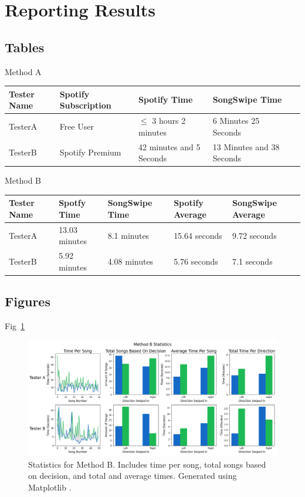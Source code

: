 \documentclass{article}
\begin{document}
\section{Reporting Results}

\subsection*{Tables}
Method A
\begin{longtable}{lllll}
Tester Name & Spotify Subscription & Spotify Time & SongSwipe Time \\
\hline
TesterA & Free User & $\leq$ 3 hours 2 minutes & 6 Minutes 25 Seconds \\
TesterB & Spotify Premium & 42 minutes and 5 Seconds & 13 Minutes and 38 Seconds \\
\end{longtable}

Method B
\begin{longtable}{lllll}
    Tester Name & Spotfy Time & SongSwipe Time & Spotify Average & SongSwipe Average \\
    \hline
    TesterA & 13.03 minutes & 8.1 minutes & 15.64 seconds & 9.72 seconds \\
    TesterB & 5.92 minutes & 4.08 minutes & 5.76 seconds & 7.1 seconds \\
\end{longtable}

\subsection*{Figures}

Fig~\ref{fig:methodbstats}

\begin{figure}[ht]
    \centering
    \includegraphics[width=6in]{./method_b_statistics.png}
    \caption{Statistics for Method B. Includes time per song, total songs based on decision, and total and average times. Generated using Matplotlib \cite{Matplot}.}
    \label{fig:methodbstats}
  \end{figure}
\end{document}
